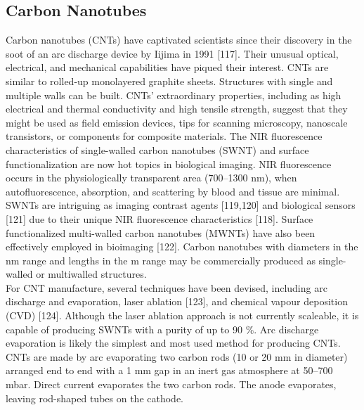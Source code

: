 \documentclass[12pt]{article}
\begin{document}
\subsection*{Carbon Nanotubes} 
Carbon nanotubes (CNTs) have captivated scientists since their discovery in the soot of an arc discharge device by Iijima in 1991 [117]. Their unusual optical, electrical, and mechanical capabilities have piqued their interest. CNTs are similar to rolled-up monolayered graphite sheets. Structures with single and multiple walls can be built. CNTs' extraordinary properties, including as high electrical and thermal conductivity and high tensile strength, suggest that they might be used as field emission devices, tips for scanning microscopy, nanoscale transistors, or components for composite materials. The NIR fluorescence characteristics of single-walled carbon nanotubes (SWNT) and surface functionalization are now hot topics in biological imaging. NIR fluorescence occurs in the physiologically transparent area (700–1300 nm), when autofluorescence, absorption, and scattering by blood and tissue are minimal. SWNTs are intriguing as imaging contrast agents [119,120] and biological sensors [121] due to their unique NIR fluorescence characteristics [118]. Surface functionalized multi-walled carbon nanotubes (MWNTs) have also been effectively employed in bioimaging [122]. Carbon nanotubes with diameters in the nm range and lengths in the m range may be commercially produced as single-walled or multiwalled structures.\\
For CNT manufacture, several techniques have been devised, including arc discharge and evaporation, laser ablation [123], and chemical vapour deposition (CVD) [124]. Although the laser ablation approach is not currently scaleable, it is capable of producing SWNTs with a purity of up to 90 $\%$. Arc discharge evaporation is likely the simplest and most used method for producing CNTs. CNTs are made by arc evaporating two carbon rods (10 or 20 mm in diameter) arranged end to end with a 1 mm gap in an inert gas atmosphere at 50–700 mbar. Direct current evaporates the two carbon rods.  The anode evaporates, leaving rod-shaped tubes on the cathode.
\end{document}
